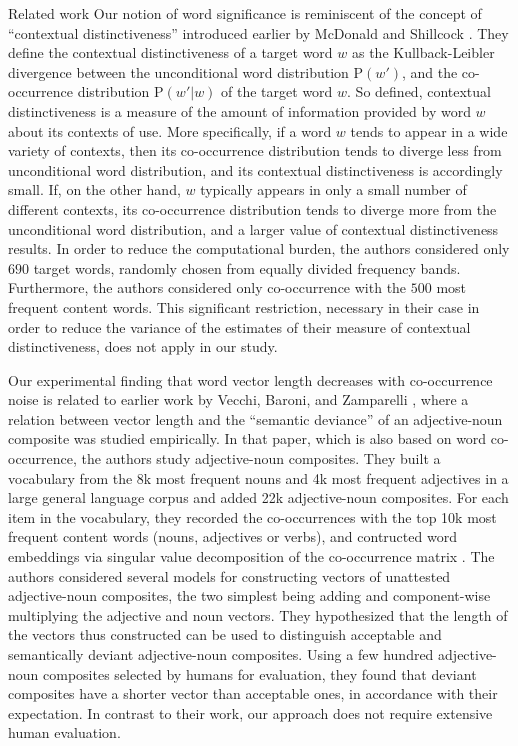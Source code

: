 \documentclass{article} %
\newcommand{\p}{\mathrm{P}}
\begin{document}
\begin{section}{Related work}\label{related-work}
Our notion of word significance is reminiscent of the concept of
``contextual distinctiveness'' introduced earlier by McDonald and
Shillcock \cite{mcdonald2001contextual}.
They define the contextual distinctiveness of a target word $w$ as the
Kullback-Leibler divergence
between the unconditional word distribution $\p(w')$, and the
co-occurrence distribution $\p(w' | w)$ of the target word $w$.
So defined, contextual distinctiveness is a measure of the amount of
information provided by word $w$ about its contexts of use.  More specifically, if a word $w$ tends to appear in a wide variety of contexts, then its co-occurrence distribution tends to diverge less from unconditional word distribution, and its
contextual distinctiveness is accordingly small.  If, on the other hand,
$w$ typically appears in only a small number of different contexts, its co-occurrence distribution tends to diverge more from the unconditional word distribution, and a larger value of contextual distinctiveness results.
In order to reduce the computational burden, the authors considered only $690$ target words, randomly chosen from equally divided frequency bands.
Furthermore, the authors considered only co-occurrence with the $500$ most frequent content words.
This significant restriction, necessary in their case in order to reduce the variance of the estimates of their measure of contextual distinctiveness, does not apply in our study.

Our experimental finding that word vector length decreases with
co-occurrence noise is related to earlier work by Vecchi, Baroni, and
Zamparelli \cite{vecchi-baroni-zamparelli2011}, where a relation between
vector length and the ``semantic deviance'' of an adjective-noun
composite was studied empirically.  
In that paper, which is also based
on word co-occurrence, the authors study adjective-noun composites.
They built a vocabulary from the 8k most frequent nouns and 4k most frequent adjectives in a large general language corpus and added 22k adjective-noun composites.
For each item in the vocabulary, they recorded the co-occurrences with the top 10k most frequent content words (nouns, adjectives or verbs), and contructed word embeddings via singular value decomposition of the co-occurrence matrix \cite{landauer-dumais1997}.
The authors considered several models for constructing vectors of unattested adjective-noun composites, the two simplest being adding and component-wise multiplying the adjective and noun vectors.
They hypothesized that the length of the vectors thus constructed can be used to distinguish acceptable and semantically deviant adjective-noun composites.
Using a few hundred adjective-noun composites selected by humans for evaluation, they found that deviant composites have a shorter vector than acceptable ones, in accordance with their expectation.
In contrast to their work, our approach does not require extensive human evaluation.


\end{section}
\end{document}
